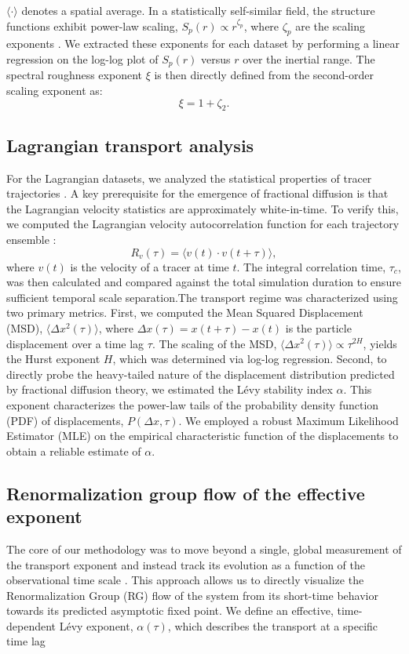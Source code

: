 \documentclass[]{article}
\begin{document}
$\langle \cdot \rangle$ denotes a spatial average. In a statistically self-similar field, the structure functions exhibit power-law scaling, $S_p(r) \propto r^{\zeta_p}$, where $\zeta_p$ are the scaling exponents  \citep{eyink2000selfsimilardecaykraichnanmodel}. We extracted these exponents for each dataset by performing a linear regression on the log-log plot of $S_p(r)$ versus $r$ over the inertial range. The spectral roughness exponent $\xi$ is then directly defined from the second-order scaling exponent as:\begin{equation}\xi = 1 + \zeta_2.\end{equation}\subsection{Lagrangian transport analysis}For the Lagrangian datasets, we analyzed the statistical properties of tracer trajectories  \citep{biferale2024turblagrdatabase3dlagrangian}. A key prerequisite for the emergence of fractional diffusion is that the Lagrangian velocity statistics are approximately white-in-time. To verify this, we computed the Lagrangian velocity autocorrelation function for each trajectory ensemble  \citep{dewit2026datadrivenmorizwanzigmodelinglagrangian}:\begin{equation}R_v(\tau) = \langle v(t) \cdot v(t+\tau) \rangle,\end{equation}where $v(t)$ is the velocity of a tracer at time $t$. The integral correlation time, $\tau_c$, was then calculated and compared against the total simulation duration to ensure sufficient temporal scale separation.The transport regime was characterized using two primary metrics. First, we computed the Mean Squared Displacement (MSD), $\langle \Delta x^2(\tau) \rangle$, where $\Delta x(\tau) = x(t+\tau) - x(t)$ is the particle displacement over a time lag $\tau$. The scaling of the MSD, $\langle \Delta x^2(\tau) \rangle \propto \tau^{2H}$, yields the Hurst exponent $H$, which was determined via log-log regression. Second, to directly probe the heavy-tailed nature of the displacement distribution predicted by fractional diffusion theory, we estimated the Lévy stability index $\alpha$. This exponent characterizes the power-law tails of the probability density function (PDF) of displacements, $P(\Delta x, \tau)$. We employed a robust Maximum Likelihood Estimator (MLE) on the empirical characteristic function of the displacements to obtain a reliable estimate of $\alpha$.\subsection{Renormalization group flow of the effective exponent}The core of our methodology was to move beyond a single, global measurement of the transport exponent and instead track its evolution as a function of the observational time scale  \citep{bouchara2015anomaloustransportobservableaverage}. This approach allows us to directly visualize the Renormalization Group (RG) flow of the system from its short-time behavior towards its predicted asymptotic fixed point. We define an effective, time-dependent Lévy exponent, $\alpha(\tau)$, which describes the transport at a specific time lag 
\end{document}
